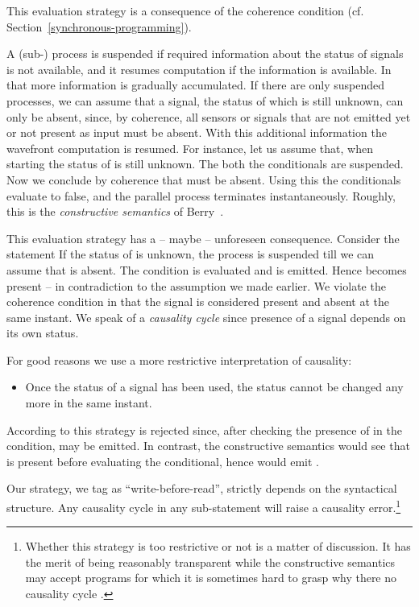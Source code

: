 This evaluation strategy is a consequence of the coherence condition (cf. Section~\ref{synchronous-programming}).
 
A (sub-) process is suspended if required information about the status
of signals is not available, and it resumes computation if the
information is available.  In that more information is gradually
accumulated.  If there are only suspended processes, we can assume that
a signal, the status of which is still unknown, can only be absent,
since, by coherence, all sensors or signals that are not emitted yet or not
present as input must be absent.  With this additional information the
wavefront computation is resumed.  For instance, let us assume that, 
when starting
% 
% 
the status of  is still unknown.  The both the conditionals are
suspended.  Now we conclude by coherence that  must be absent. 
Using this the conditionals evaluate to false, and the parallel
process terminates instantaneously.  Roughly, this is the
\emph{constructive semantics} of Berry~\cite{constructivesemantics}.

This evaluation strategy has a -- maybe -- unforeseen consequence.  Consider
the statement
% 
% 
If the status of  is unknown, the process is suspended till we can
assume that  is absent.  The condition is evaluated and  
is
emitted.  Hence  becomes present -- in contradiction to the
assumption we made earlier.  We violate the coherence condition in
that the signal  is considered present and absent at the same
instant.  We speak of a \emph{causality cycle}
since presence of a signal depends on its own status.

For good reasons we use a more restrictive
interpretation of causality: 
\begin{itemize}
\item Once the status of a signal has been used, 
the status cannot be changed any more in the same instant.
\end{itemize}
According to this strategy
% 
% 
is rejected since, after checking the presence of  in the 
condition,  may be emitted. In contrast, the constructive 
semantics would see that  is present before evaluating the 
conditional, hence would emit .

Our strategy, we tag as ``write-before-read'', 
strictly depends on the 
syntactical structure. Any causality cycle in any sub-statement will 
raise a causality error.\footnote{Whether this strategy is too 
restrictive or not is a matter of discussion. It has the merit of 
being reasonably transparent while the constructive semantics may 
accept programs for which it is sometimes hard to grasp why there no 
causality cycle
.}


